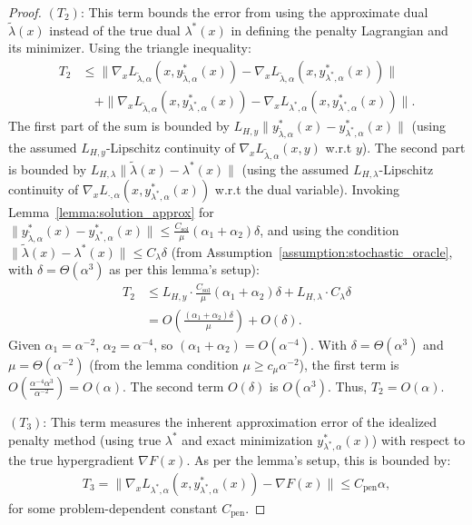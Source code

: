 \documentclass[letterpaper]{article} %
\newcommand{\1}{\mathbf{1}}
\begin{document}
\begin{proof}
$(T_2)$: This term bounds the error from using the approximate dual $\tilde{\lambda}(x)$ instead of the true dual $\lambda^*(x)$ in defining the penalty Lagrangian and its minimizer. Using the triangle inequality:
\begin{align}
T_2 &\leq \|\nabla_x L_{\tilde{\lambda},\alpha}(x, y^*_{\tilde{\lambda},\alpha}(x)) - \nabla_x L_{\tilde{\lambda},\alpha}(x, y^*_{\lambda^*,\alpha}(x))\| \nonumber \\
&\quad + \|\nabla_x L_{\tilde{\lambda},\alpha}(x, y^*_{\lambda^*,\alpha}(x)) - \nabla_x L_{\lambda^*,\alpha}(x, y^*_{\lambda^*,\alpha}(x))\|.
\end{align}
The first part of the sum is bounded by $L_{H,y} \|y^*_{\tilde{\lambda},\alpha}(x) - y^*_{\lambda^*,\alpha}(x)\|$ (using the assumed $L_{H,y}$-Lipschitz continuity of $\nabla_x L_{\tilde{\lambda},\alpha}(x,y)$ w.r.t $y$). The second part is bounded by $L_{H,\lambda} \|\tilde{\lambda}(x) - \lambda^*(x)\|$ (using the assumed $L_{H,\lambda}$-Lipschitz continuity of $\nabla_x L_{\cdot,\alpha}(x,y^*_{\lambda^*,\alpha}(x))$ w.r.t the dual variable).
Invoking Lemma~\ref{lemma:solution_approx} for $\|y^*_{\tilde{\lambda},\alpha}(x) - y^*_{\lambda^*,\alpha}(x)\| \leq \frac{C_{\text{sol}}}{\mu}(\alpha_1 + \alpha_2)\delta$, and using the condition $\|\tilde{\lambda}(x)-\lambda^*(x)\|\le C_\lambda\delta$ (from Assumption~\ref{assumption:stochastic_oracle}, with $\delta = \Theta(\alpha^3)$ as per this lemma's setup):
\begin{align}
T_2 &\leq L_{H,y} \cdot \frac{C_{\text{sol}}}{\mu}(\alpha_1 + \alpha_2)\delta + L_{H,\lambda} \cdot C_\lambda \delta \\
&= O\left(\frac{(\alpha_1 + \alpha_2)\delta}{\mu}\right) + O(\delta). \label{eq:T2_bound_detail}
\end{align}
Given $\alpha_1 = \alpha^{-2}$, $\alpha_2 = \alpha^{-4}$, so $(\alpha_1+\alpha_2) = O(\alpha^{-4})$. With $\delta = \Theta(\alpha^3)$ and $\mu = \Theta(\alpha^{-2})$ (from the lemma condition $\mu \ge c_\mu \alpha^{-2}$), the first term is $O\left(\frac{\alpha^{-4}\alpha^3}{\alpha^{-2}}\right) = O(\alpha)$. The second term $O(\delta)$ is $O(\alpha^3)$. Thus, $T_2 = O(\alpha)$.

$(T_3)$: This term measures the inherent approximation error of the idealized penalty method (using true $\lambda^*$ and exact minimization $y^*_{\lambda^*,\alpha}(x)$) with respect to the true hypergradient $\nabla F(x)$. As per the lemma's setup, this is bounded by:
\begin{align}
T_3 = \|\nabla_x L_{\lambda^*,\alpha}(x, y^*_{\lambda^*,\alpha}(x)) - \nabla F(x)\| \leq C_{\text{pen}} \alpha,
\end{align}
for some problem-dependent constant $C_{\text{pen}}$.


\end{proof}
\end{document}
